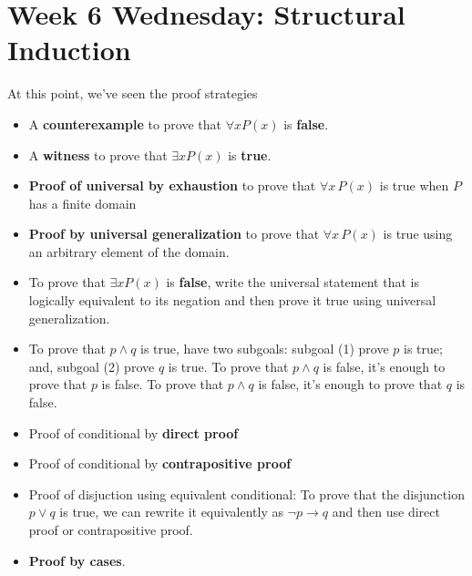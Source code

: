 \section*{Week 6 Wednesday: Structural Induction}


At this point, we've seen the proof strategies
\begin{multicols}{2}
    \begin{itemize}
        \item A {\bf counterexample} to prove that  $\forall x P(x)$ is {\bf false}.
        \item  A {\bf witness} to prove that  $\exists x P(x)$ is {\bf true}.
        \item {\bf Proof of universal by exhaustion} to prove that $\forall x \, P(x)$
    is true when $P$ has a finite domain
        \item  {\bf Proof by universal generalization} to prove that $\forall x \, P(x)$
    is true using an arbitrary element of the domain.
        \item To  prove  that $\exists x P(x)$ is {\bf false}, write the universal statement that is 
        logically equivalent to its negation and then prove it true using universal generalization.
        \item To prove that $p \land q$ is true, have two subgoals: 
        subgoal (1) prove $p$ is  true; and, subgoal (2) prove $q$ is true. To prove that $p \land q$ is false, it's enough to prove that $p$ is false.
     To prove that $p \land q$ is false, it's enough to prove that $q$ is false.
        \item Proof of conditional by {\bf direct proof}
        \item Proof of conditional by {\bf contrapositive proof}
        \item Proof of disjuction using equivalent conditional: To prove that the 
        disjunction $p \lor q$ is true, we can rewrite it equivalently as $\lnot p \to q$ and
        then use direct proof or contrapositive proof.
        \item {\bf Proof by cases}.
    \end{itemize}
\end{multicols}
\newpage

\newpage


\newpage

\newpage


